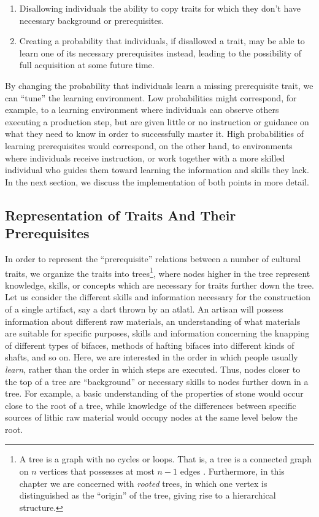 \documentclass[graybox,natbib]{svmult}
\begin{document}
\begin{enumerate}
\def\labelenumi{\arabic{enumi}.}
\itemsep1pt\parskip0pt
\item
  Disallowing individuals the ability to copy traits for which they
  don't have necessary background or prerequisites.
\item
  Creating a probability that individuals, if disallowed a trait, may be
  able to learn one of its necessary prerequisites instead, leading to
  the possibility of full acquisition at some future time.
\end{enumerate}

By changing the probability that individuals learn a missing
prerequisite trait, we can ``tune'' the learning environment. Low
probabilities might correspond, for example, to a learning environment
where individuals can observe others executing a production step, but
are given little or no instruction or guidance on what they need to know
in order to successfully master it. High probabilities of learning
prerequisites would correspond, on the other hand, to environments where
individuals receive instruction, or work together with a more skilled
individual who guides them toward learning the information and skills
they lack. In the next section, we discuss the implementation of both
points in more detail.

\subsection{Representation of Traits And Their
Prerequisites}\label{representation-of-traits-and-their-prerequisites}

In order to represent the ``prerequisite'' relations between a number of
cultural traits, we organize the traits into trees\footnote{A tree is a
  graph with no cycles or loops. That is, a tree is a connected graph on
  $n$ vertices that possesses at most $n-1$ edges
  \citep{diestel2010graph}. Furthermore, in this chapter we are
  concerned with \emph{rooted} trees, in which one vertex is
  distinguished as the ``origin'' of the tree, giving rise to a
  hierarchical structure.}, where nodes higher in the tree represent
knowledge, skills, or concepts which are necessary for traits further
down the tree. Let us consider the different skills and information
necessary for the construction of a single artifact, say a dart thrown
by an atlatl. An artisan will possess information about different raw
materials, an understanding of what materials are suitable for specific
purposes, skills and information concerning the knapping of different
types of bifaces, methods of hafting bifaces into different kinds of
shafts, and so on. Here, we are interested in the order in which people
usually \emph{learn}, rather than the order in which steps are executed.
Thus, nodes closer to the top of a tree are ``background'' or necessary
skills to nodes further down in a tree. For example, a basic
understanding of the properties of stone would occur close to the root
of a tree, while knowledge of the differences between specific sources
of lithic raw material would occupy nodes at the same level below the
root.
\end{document}
